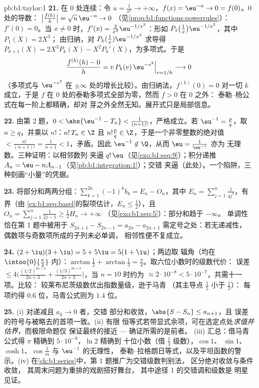 \begin{solution}{pb:b1:taylor:1}
\textbf{21.} 在 $0$ 处连续：令 $u = \frac{1}{x^2} \to
+\infty$，$f(x) = \eu^{-u} \to 0 = f(0)$。$0$ 处的导数：
$\bigl|\frac{f(h)}{h}\bigr| = \sqrt u\,\eu^{-u} \to 0$
（见\cref{prop:b1:functions:powerrules}）：$f'(0) = 0$。当 $x \neq
0$ 时，$f'(x) = \frac{2}{x^3}\eu^{-1/x^2}$：形如
$P_1\bigl(\frac1x\bigr)\eu^{-1/x^2}$，其中 $P_1(X) = 2X^3$；
由归纳，对 $P_k(\frac1x)\eu^{-1/x^2}$ 求导得
$P_{k+1}(X) = 2X^3 P_k(X) - X^2 P_k'(X)$，为多项式。于是
\[
\frac{f^{(k)}(h) - 0}{h} = v\,P_k(v)\,\eu^{-v^2}
\Big|_{v = 1/h} \longrightarrow 0
\]
（多项式与 $\eu^{-v^2}$ 在
$\pm\infty$ 处的增长比较）。由归纳法，$f^{(k)}(0) = 0$ 对一切 $k$ 成立，于是
$f$ 在 $0$ 处的泰勒多项式全部为零，然而 $f > 0$ 在 $0$ 之外：
泰勒--杨公式在每一阶上都精确，却对
芽之外全然无知。展开式只是局部信息。

\textbf{22.} 由第 2 题，$0 < \abs{\eu^{-1} - T_n} <
\frac{1}{(n+1)!}$，严格成立。若 $\eu^{-1} = \frac pq$，取 $n
\geq q$，并乘以 $n!$：$n!\,T_n \in \Z$ 且 $n!\frac pq
\in \Z$，于是一个非零整数的绝对值 $<
\frac{n!}{(n+1)!} = \frac{1}{n+1} < 1$，矛盾。因此
$\eu^{-1} \notin \Q$，从而 $\eu = \frac{1}{\eu^{-1}}$ 亦为
无理数。三种证明：以相邻数列
夹逼 $q!\,\eu$（见\cref{exo:b1:seq:9}）；积分递推 $A_n =
\eu - nA_{n-1}$（见\cref{pb:b1:integration:1}）；交错
夹逼（此处）。一个陷阱，三种刻画“小量”的凭据。

\textbf{23.} 将部分和两两分组：$\sum_{k=1}^{2n}
(-1)^k b_k = E_n - O_n$，其中 $E_n = \sum_{j=1}^{n}
\frac{1}{4j^2}$，有界（由
\cref{ex:b1:seq:basel}的裂项估计，$E_n \leq \frac12$），且 $O_n =
\sum_{j=1}^{n}\frac{1}{2j-1} \geq \frac12 H_n \to +\infty$
（见\cref{exo:b1:seq:5}）：部分和趋于 $-\infty$。
单调性恰在第 1 题中被用于 $S_{2n+1} -
S_{2n-1} = a_{2n} - a_{2n+1}$ 需定号之处：若无递减性，
偶数项与奇数项所成的子列未必单调，
相邻性便不复成立。

\textbf{24.} $(2+\iu)(3+\iu) = 5 + 5\iu = 5(1+\iu)$；两边取
辐角（均在 $\intoo{0}{\frac\pi2}$ 内）：$\arctan\frac12 +
\arctan\frac13 = \frac\pi4$。取六位小数时的级数代价：
误差 $\leq 4\bigl(\frac{(1/2)^{2n+3}}{2n+3} +
\frac{(1/3)^{2n+3}}{2n+3}\bigr)$，当 $n = 10$ 时约为
$\approx 2\cdot10^{-8} < 5\cdot10^{-7}$，共需十一项。比较：
较莱布尼茨级数优出指数量级，逊于马青
（其主导点 $\frac15$ 小于 $\frac12$）：
每项约得 $0.6$ 位，马青公式则为 $1.4$ 位。

\textbf{25.} (i) 对递减且 $a_k \to 0$ 者，交错
部分和收敛，$\abs{S - S_n} \leq a_{n+1}$，且
误差的符号与被略去的首项一致。(ii) 有限
恒等式若带显式余项，可在选定点处\emph{求值并
估界}，而极限命题仅
保证最终的接近 --- 确证所需的是前者。
(iii) 汇总：借马青公式得 $\pi$ 精确到 $5\cdot10^{-8}$，$\ln 2$ 精确到
十位小数（借 $\frac13$ 级数），$\cos 1$、
$\sin 1$、$\cosh 1$、$\cos\frac1m$ 与 $\eu^{-1}$ 的无理性，
泰勒–拉格朗日等式，以及平坦函数的警示。(iv)
在\cref{ch:b1:series}中，第 1 题推广为交错级数判别法，
区分绝对收敛与条件收敛，
其周末问题为重排的戏剧搭好舞台，
其中途径 1 的交错调和级数是
明星见证。
\end{solution}
